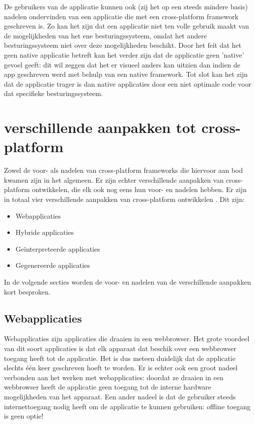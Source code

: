 De gebruikers van de applicatie kunnen ook (zij het op een steeds mindere basis) nadelen ondervinden van een applicatie die met een cross-platform framework geschreven is. Zo kan het zijn dat een applicatie niet ten volle gebruik maakt van de mogelijkheden van het ene besturingssysteem, omdat het andere besturingssysteem niet over deze mogelijkheden beschikt. Door het feit dat het geen native applicatie betreft kan het verder zijn dat de applicatie geen 'native' gevoel geeft: dit wil zeggen dat het er visueel anders kan uitzien dan indien de app geschreven werd met behulp van een native framework. Tot slot kan het zijn dat de applicatie trager is dan native applicaties door een niet optimale code voor dat specifieke besturingssysteem.

\section{verschillende aanpakken tot cross-platform}
\label{sec:aanpakkenCrossPlatform}

 Zowel de voor- als nadelen van cross-platform frameworks die hiervoor aan bod kwamen zijn in het algemeen. Er zijn echter verschillende aanpakken van cross-platform ontwikkelen, die elk ook nog eens hun voor- en nadelen hebben. Er zijn in totaal vier verschillende aanpakken van cross-platform ontwikkelen \autocite{Xanthopoulos2013}. Dit zijn:
 
 \begin{itemize}
     \item Webapplicaties
     \item Hybride applicaties
     \item Geïnterpreteerde applicaties
     \item Gegenereerde applicaties
 \end{itemize}

In de volgende secties worden de voor- en nadelen van de verschillende aanpakken kort besproken.

\subsection{Webapplicaties}
\label{subsec:webapps}

Webapplicaties zijn applicaties die draaien in een webbrowser. Het grote voordeel van dit soort applicaties is dat elk apparaat dat beschik over een webbrowser toegang heeft tot de applicatie. Het is dus meteen duidelijk dat de applicatie slechts één keer geschreven hoeft te worden. Er is echter ook een groot nadeel verbonden aan het werken met webapplicaties: doordat ze draaien in een webbrowser heeft de applicatie geen toegang tot de interne hardware mogelijkheden van het apparaat. Een ander nadeel is dat de gebruiker steeds internettoegang nodig heeft om de applicatie te kunnen gebruiken: offline toegang is geen optie!

